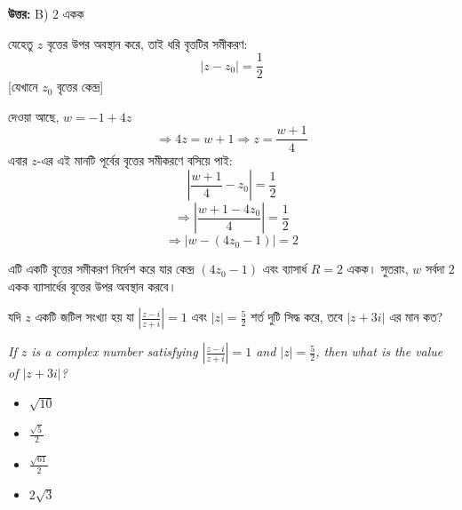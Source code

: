 \documentclass[12pt, a4paper]{article}
\begin{document}
\vspace{0.5em}
\begin{tcolorbox}[answerbox]
    \textbf{\color{success} উত্তর:} B) $2$ একক
\end{tcolorbox}
\vspace{1em}

\begin{tcolorbox}[solutionbox={সমাধান (Solution)}]
    \noindent
    যেহেতু $z$ বৃত্তের উপর অবস্থান করে, তাই ধরি বৃত্তটির সমীকরণ:
    \[ |z - z_0| = \frac{1}{2} \]
    [যেখানে $z_0$ বৃত্তের কেন্দ্র] 
    
    \vspace{0.5em}
    দেওয়া আছে, $w = -1 + 4z$
    \[ \Rightarrow 4z = w + 1 \Rightarrow z = \frac{w+1}{4} \]
    এবার $z$-এর এই মানটি পূর্বের বৃত্তের সমীকরণে বসিয়ে পাই:
    \[ \left|\frac{w+1}{4} - z_0\right| = \frac{1}{2} \]
    \[ \Rightarrow \left|\frac{w + 1 - 4z_0}{4}\right| = \frac{1}{2} \]
    \[ \Rightarrow |w - (4z_0 - 1)| = 2 \]
    
    \vspace{0.5em}
    এটি একটি বৃত্তের সমীকরণ নির্দেশ করে যার কেন্দ্র $(4z_0 - 1)$ এবং ব্যাসার্ধ $R = 2$ একক। সুতরাং, $w$ সর্বদা $2$ একক ব্যাসার্ধের বৃত্তের উপর অবস্থান করবে।
\end{tcolorbox}
\vspace{1em}

\begin{tcolorbox}[questionbox={প্রশ্ন (Question) 5}]
    \noindent
    যদি $z$ একটি জটিল সংখ্যা হয় যা $\left|\frac{z-i}{z+i}\right| = 1$ এবং $|z| = \frac{5}{2}$ শর্ত দুটি সিদ্ধ করে, তবে $|z + 3i|$ এর মান কত?
    
    \vspace{0.8em}
    \begin{english}
    \noindent\textit{\color{darkgray}
    If $z$ is a complex number satisfying $\left|\frac{z-i}{z+i}\right| = 1$ and $|z| = \frac{5}{2}$, then what is the value of $|z + 3i|$?
    }
    \end{english}
\end{tcolorbox}

\begin{itemize}[label={}, leftmargin=1cm, itemsep=0.5em]
    \item[\textbf{A)}] $\sqrt{10}$
    \item[\textbf{B)}] $\frac{\sqrt{5}}{2}$
    \item[\textbf{C)}] $\frac{\sqrt{61}}{2}$
    \item[\textbf{D)}] $2\sqrt{3}$
\end{itemize}
\end{document}
